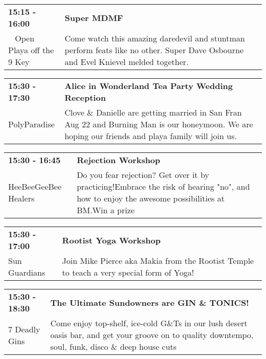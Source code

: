 \begin{tabular}{ p{1in} p{2.2in} }
    \textbf{15:15 - 16:00} & \textbf{Super MDMF} \\
    ~ \newline Open Playa off the 9 Key & Come watch this amazing daredevil and stuntman perform feats like no other.  Super Dave Osbourne and Evel Knievel melded together. \\
    \hline 
\end{tabular}
    
\begin{tabular}{ p{1in} p{2.2in} }
    \textbf{15:30 - 17:30} & \textbf{Alice in Wonderland Tea Party Wedding Reception} \\
    PolyParadise \newline  & Clove \& Danielle are getting married in San Fran Aug 22 and Burning Man is our honeymoon. We are hoping our friends and playa family will join us. \\
    \hline 
\end{tabular}
    
\begin{tabular}{ p{1in} p{2.2in} }
    \textbf{15:30 - 16:45} & \textbf{Rejection Workshop                                } \\
    HeeBeeGeeBee Healers \newline  & Do you fear rejection? Get over it by practicing!Embrace the risk of hearing "no", and how to enjoy the awesome possibilities at BM.Win a prize \\
    \hline 
\end{tabular}
    
\begin{tabular}{ p{1in} p{2.2in} }
    \textbf{15:30 - 17:00} & \textbf{Rootist Yoga Workshop} \\
    Sun Guardians \newline  & Join Mike Pierce aka Makia from the Rootist Temple to teach a very special form of Yoga! \\
    \hline 
\end{tabular}
    
\begin{tabular}{ p{1in} p{2.2in} }
    \textbf{15:30 - 18:30} & \textbf{The Ultimate Sundowners are GIN \& TONICS!} \\
    7 Deadly Gins \newline  & Come enjoy top-shelf, ice-cold G\&Ts in our lush desert oasis bar, and get your groove on to quality downtempo, soul, funk, disco \& deep house cuts \\
    \hline 
\end{tabular}
    
